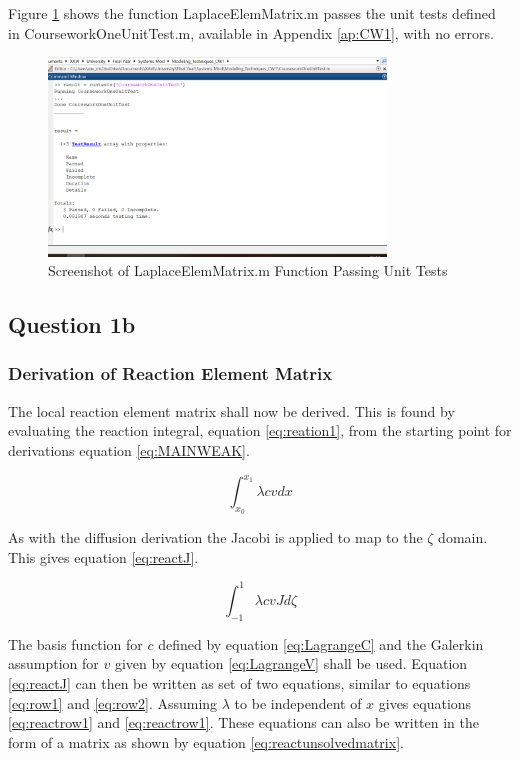 \documentclass[11pt]{article}
\begin{document}
Figure \ref{fig:passTest1} shows the function LaplaceElemMatrix.m passes the unit tests defined in CourseworkOneUnitTest.m, available in Appendix \ref{ap:CW1}, with no errors.

\begin{figure}[h!]
	\centering
	\includegraphics[width=0.8\textwidth]{CW1Test.PNG}
	\caption{Screenshot of LaplaceElemMatrix.m Function Passing Unit Tests}\label{fig:passTest1}
\end{figure}

\FloatBarrier


\subsection{Question 1b}
\subsubsection{Derivation of Reaction Element Matrix}

The local reaction element matrix shall now be derived. This is found by evaluating the reaction integral, equation \ref{eq:reation1}, from the starting point for derivations equation \ref{eq:MAINWEAK}.

\begin{equation} \label{eq:reation1}
\int_{x_{0}}^{x_{1}} \lambda c v  dx
\end{equation}

As with the diffusion derivation the Jacobi is applied to map to the $\zeta$ domain. This gives equation \ref{eq:reactJ}.

\begin{equation}
\label{eq:reactJ}
\int_{-1}^1 \lambda c v J d\zeta
\end{equation}

The basis function for $c$ defined by equation \ref{eq:LagrangeC} and the Galerkin assumption for $v$ given by equation \ref{eq:LagrangeV} shall be used. Equation \ref{eq:reactJ} can then be written as set of two equations, similar to equations \ref{eq:row1} and \ref{eq:row2}. Assuming $\lambda$ to be independent of $x$ gives equations \ref{eq:reactrow1} and \ref{eq:reactrow1}. These equations can also be written in the form of a matrix as shown by equation \ref{eq:reactunsolvedmatrix}.
\end{document}
